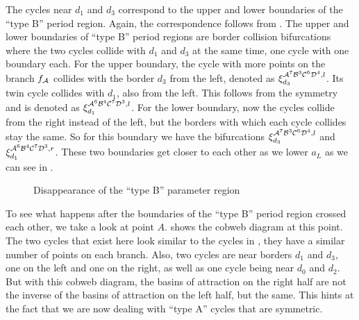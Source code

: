 The cycles near $d_1$ and $d_3$ correspond to the upper and lower boundaries of the ``type B'' period region.
Again, the correspondence follows from .
The upper and lower boundaries of ``type B'' period regions are border collision bifurcations where the two cycles collide with $d_1$ and $d_3$ at the same time, one cycle with one boundary each.
For the upper boundary, the cycle with more points on the branch $f_{\mathcal{A}}$ collides with the border $d_3$ from the left, denoted as $\xi_{d_3}^{\mathcal{A}^7\mathcal{B}^3\mathcal{C}^6\mathcal{D}^4, l}$.
Its twin cycle collides with $d_1$, also from the left.
This follows from the symmetry and is denoted as $\xi_{d_1}^{\mathcal{A}^6\mathcal{B}^4\mathcal{C}^7\mathcal{D}^3, l}$.
For the lower boundary, now the cycles collide from the right instead of the left, but the borders with which each cycle collides stay the same.
So for this boundary we have the bifurcations $\xi_{d_3}^{\mathcal{A}^7\mathcal{B}^3\mathcal{C}^6\mathcal{D}^4, l}$ and $\xi_{d_1}^{\mathcal{A}^6\mathcal{B}^4\mathcal{C}^7\mathcal{D}^3, r}$.
These two boundaries get closer to each other as we lower $a_L$ as we can see in .

\begin{figure}
    \centering
    \label{fig:minrep.just.before.disappearance}
    \caption{Disappearance of the ``type B'' parameter region}
\end{figure}

To see what happens after the boundaries of the ``type B'' period region crossed each other, we take a look at point $A$.
 shows the cobweb diagram at this point.
The two cycles that exist here look similar to the cycles in , they have a similar number of points on each branch.
Also, two cycles are near borders $d_1$ and $d_3$, one on the left and one on the right, as well as one cycle being near $d_0$ and $d_2$.
But with this cobweb diagram, the basins of attraction on the right half are not the inverse of the basins of attraction on the left half, but the same.
This hints at the fact that we are now dealing with ``type A'' cycles that are symmetric.


